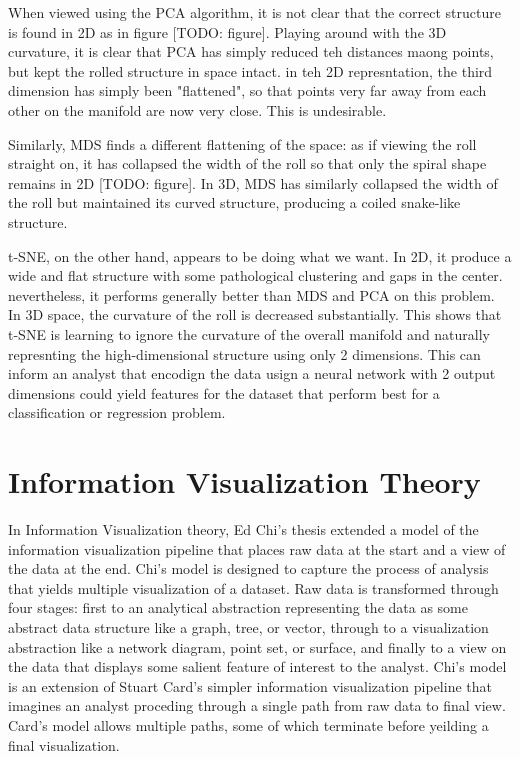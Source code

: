 \documentclass{sigchi}
\begin{document}
When viewed using the PCA algorithm, it is not clear that the correct structure is found in 2D as in figure [TODO: figure]. Playing around with the 3D curvature, it is clear that PCA has simply reduced teh distances maong points, but kept the rolled structure in space intact. in teh 2D represntation, the third dimension has simply been "flattened", so that points very far away from each other on the manifold are now very close. This is undesirable.

Similarly, MDS finds a different flattening of the space: as if viewing the roll straight on, it has collapsed the width of the roll so that only the spiral shape remains in 2D [TODO: figure]. In 3D, MDS has similarly collapsed the width of the roll but maintained its curved structure, producing a coiled snake-like structure.

t-SNE, on the other hand, appears to be doing what we want. In 2D, it produce a wide and flat structure with some pathological clustering and gaps in the center. nevertheless, it performs generally better than MDS and PCA on this problem. In 3D space, the curvature of the roll is decreased substantially. This shows that t-SNE is learning to ignore the curvature of the overall manifold and naturally represnting the high-dimensional structure using only 2 dimensions. This can inform an analyst that encodign the data usign a neural network with 2 output dimensions could yield features for the dataset that perform best for a classification or regression problem.

%
\section{Information Visualization Theory}%
%
In Information Visualization theory, Ed Chi’s thesis extended a model of the information visualization pipeline \cite{stuart card} that places raw data at the start and a view of the data at the end. Chi’s model is designed to capture the process of analysis that yields multiple visualization of a dataset. Raw data is transformed through four stages: first to an analytical abstraction representing the data as some abstract data structure like a graph, tree, or vector, through to a visualization abstraction like a network diagram, point set, or surface, and finally to a view on the data that displays some salient feature of interest to the analyst. Chi’s model is an extension of Stuart Card’s simpler information visualization pipeline that imagines an analyst proceding through a single path from raw data to final view. Card’s model allows multiple paths, some of which terminate before yeilding a final visualization.
\end{document}
